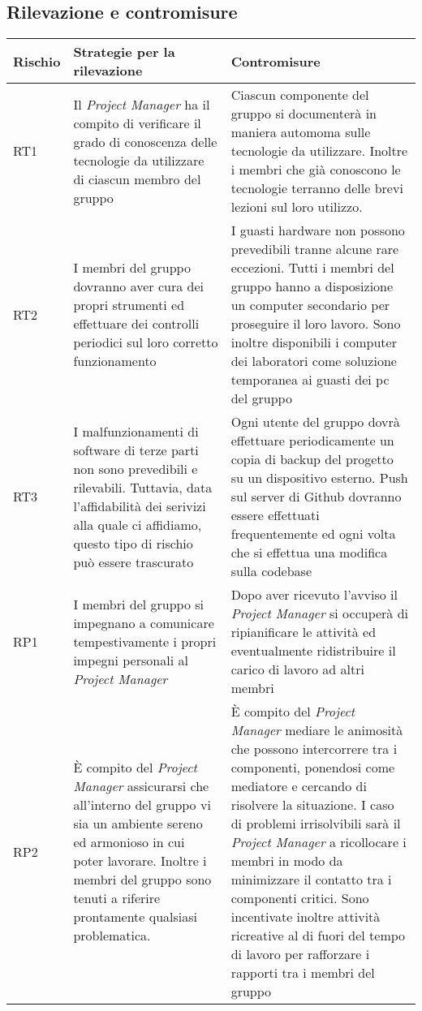 \subsection{Rilevazione e contromisure}

\begin{longtable}[H]{|l|C{5cm}|C{7cm}|}
		\hline
		\textbf{Rischio} & \textbf{Strategie per la rilevazione}  & \textbf{Contromisure}  \\
		\hline
		RT1     & Il \emph{Project Manager} ha il compito di verificare il grado di conoscenza delle tecnologie da utilizzare di ciascun membro del gruppo & Ciascun componente del gruppo si documenterà in maniera automoma sulle tecnologie da utilizzare. Inoltre i membri che già conoscono le tecnologie terranno delle brevi lezioni sul loro utilizzo.\\
		\hline
		RT2     & I membri del gruppo dovranno aver cura dei propri strumenti ed effettuare dei controlli periodici sul loro corretto funzionamento & I guasti hardware non possono prevedibili tranne alcune rare eccezioni. Tutti i membri del gruppo hanno a disposizione un computer secondario per proseguire il loro lavoro. Sono inoltre disponibili i computer dei laboratori come soluzione temporanea ai guasti dei pc del gruppo\\
		\hline
		RT3     & I malfunzionamenti di software di terze parti non sono prevedibili e rilevabili. Tuttavia, data l'affidabilità dei serivizi alla quale ci affidiamo, questo tipo di rischio può essere trascurato & Ogni utente del gruppo dovrà effettuare periodicamente un copia di backup del progetto su un dispositivo esterno. Push sul server di Github dovranno essere effettuati frequentemente ed ogni volta che si effettua una modifica sulla codebase \\
		\hline
		RP1     & I membri del gruppo si impegnano a comunicare tempestivamente i propri impegni personali al \emph{Project Manager} & Dopo aver ricevuto l'avviso il \emph{Project Manager} si occuperà di ripianificare le attività ed eventualmente ridistribuire il carico di lavoro ad altri membri \\
		\hline
		RP2     & È compito del \emph{Project Manager} assicurarsi che all'interno del gruppo vi sia un ambiente sereno ed armonioso in cui poter lavorare. Inoltre i membri del gruppo sono tenuti a riferire prontamente qualsiasi problematica. & È compito del \emph{Project Manager} mediare le animosità che possono intercorrere tra i componenti, ponendosi come mediatore e cercando di risolvere la situazione. I caso di problemi irrisolvibili sarà il \emph{Project Manager} a ricollocare i membri in modo da minimizzare il contatto tra i componenti critici. Sono incentivate inoltre attività ricreative al di fuori del tempo di lavoro per rafforzare i rapporti tra i membri del gruppo\\

\end{longtable}
